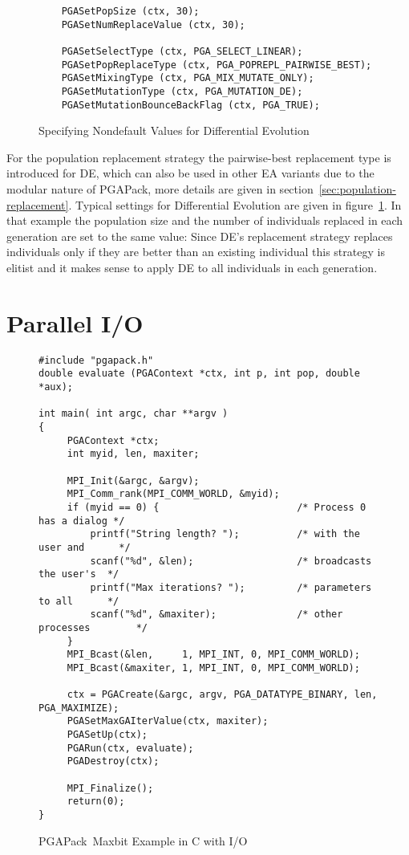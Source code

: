 \documentclass{report}
\newcommand{\pga}{PGAPack}
\begin{document}
\begin{figure}[bt]
\begin{verbatim}
    PGASetPopSize (ctx, 30);
    PGASetNumReplaceValue (ctx, 30);

    PGASetSelectType (ctx, PGA_SELECT_LINEAR);
    PGASetPopReplaceType (ctx, PGA_POPREPL_PAIRWISE_BEST);
    PGASetMixingType (ctx, PGA_MIX_MUTATE_ONLY);
    PGASetMutationType (ctx, PGA_MUTATION_DE);
    PGASetMutationBounceBackFlag (ctx, PGA_TRUE);
\end{verbatim}
\caption{Specifying Nondefault Values for Differential Evolution}
\label{example:de-settings}
\end{figure}


For the population replacement strategy the
pairwise-best replacement type is introduced for DE, which can also be
used in other EA variants due to the modular nature of \pga, more
details are given in section~\ref{sec:population-replacement}. Typical
settings for Differential Evolution are given in
figure~\ref{example:de-settings}. In that example the population size
and the number of individuals replaced in each generation are set to the
same value: Since DE's replacement strategy replaces individuals only if
they are better than an existing individual this strategy is elitist and
it makes sense to apply DE to all individuals in each generation.


\section{Parallel I/O}\label{sec:parallel-simple-example}

\begin{figure}
\begin{verbatim}
#include "pgapack.h"
double evaluate (PGAContext *ctx, int p, int pop, double *aux);

int main( int argc, char **argv )
{
     PGAContext *ctx;
     int myid, len, maxiter;

     MPI_Init(&argc, &argv);
     MPI_Comm_rank(MPI_COMM_WORLD, &myid);
     if (myid == 0) {                        /* Process 0 has a dialog */
         printf("String length? ");          /* with the user and      */
         scanf("%d", &len);                  /* broadcasts the user's  */
         printf("Max iterations? ");         /* parameters to all      */
         scanf("%d", &maxiter);              /* other processes        */
     }
     MPI_Bcast(&len,     1, MPI_INT, 0, MPI_COMM_WORLD);
     MPI_Bcast(&maxiter, 1, MPI_INT, 0, MPI_COMM_WORLD);

     ctx = PGACreate(&argc, argv, PGA_DATATYPE_BINARY, len, PGA_MAXIMIZE);
     PGASetMaxGAIterValue(ctx, maxiter);
     PGASetUp(ctx);
     PGARun(ctx, evaluate);
     PGADestroy(ctx);

     MPI_Finalize();
     return(0);
}
\end{verbatim}
\caption{\pga\ Maxbit Example in C with I/O}
\label{example:parallel-simple-main}
\end{figure}
\end{document}

